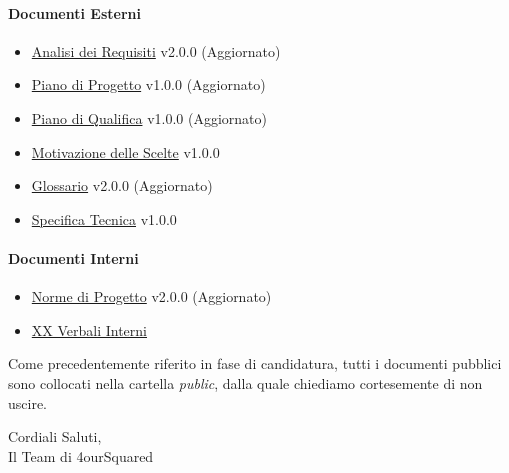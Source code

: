 \documentclass[12pt, a4paper]{article}
\begin{document}
\paragraph{Documenti Esterni}
\begin{itemize}
    \item \href{https://github.com/4ourSquared/LumosMinima/tree/main/public/esterni/analisi_dei_requisiti_v1.0.0.pdf}{Analisi dei Requisiti} v2.0.0 (Aggiornato)
    \item \href{https://github.com/4ourSquared/LumosMinima/tree/main/public/esterni/piano_di_progetto_v1.0.0.pdf}{Piano di Progetto} v1.0.0 (Aggiornato)
    \item \href{https://github.com/4ourSquared/LumosMinima/tree/main/public/esterni/piano_di_qualifica_v1.0.0.pdf}{Piano di Qualifica} v1.0.0 (Aggiornato)
    \item \href{https://github.com/4ourSquared/LumosMinima/tree/main/public/esterni/motivazione_scelte_v1.0.0.pdf}{Motivazione delle Scelte} v1.0.0
    \item \href{https://github.com/4ourSquared/LumosMinima/tree/main/public/esterni/glossario_v1.0.0.pdf}{Glossario} v2.0.0 (Aggiornato)
    \item \href{https://github.com/4ourSquared/LumosMinima/tree/main/public/esterni/specifica_tecnica_v1.0.0.pdf}{Specifica Tecnica} v1.0.0
\end{itemize}
\paragraph{Documenti Interni}
\begin{itemize}
    \item \href{https://github.com/4ourSquared/LumosMinima/tree/main/public/interni/norme_di_progetto_v1.0.0.pdf}{Norme di Progetto} v2.0.0 (Aggiornato)
    \item \href{https://github.com/4ourSquared/LumosMinima/tree/main/public/interni/verbali}{XX Verbali Interni}
\end{itemize}


Come precedentemente riferito in fase di candidatura, tutti i documenti pubblici sono collocati nella cartella \textit{public}, dalla quale chiediamo cortesemente di non uscire.

\begin{flushright}
    Cordiali Saluti,\\
    Il Team di 4ourSquared
    \end{flushright}
\end{document}

